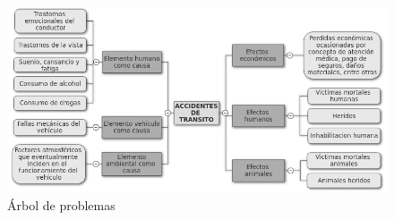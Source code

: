 \begin{figure}[h!]
  \begin{center}	\includegraphics[width=1.0\textwidth]{imagenes/arbol_p}
  \caption{\'{A}rbol de problemas}
  \label{fig:arbol}
  \end{center}
\end{figure}




